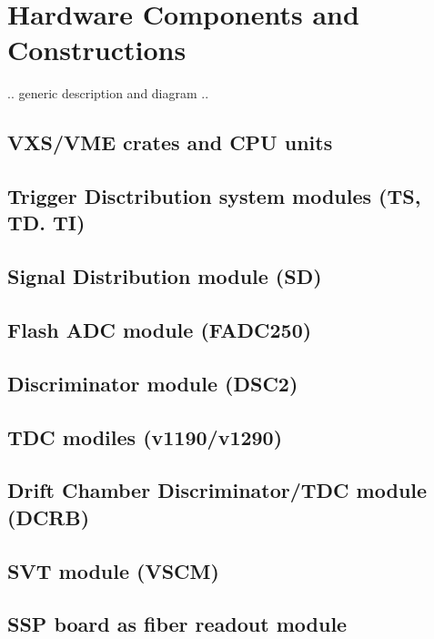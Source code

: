 \section{Hardware Components and Constructions}

.. generic description and diagram ..

\subsection{VXS/VME crates and CPU units}

\subsection{Trigger Disctribution system modules (TS, TD. TI)}
	
\subsection{Signal Distribution module (SD)}

\subsection{Flash ADC module (FADC250)}

\subsection{Discriminator module (DSC2)}

\subsection{TDC modiles (v1190/v1290)}

\subsection{Drift Chamber Discriminator/TDC module (DCRB)}

\subsection{SVT module (VSCM)}

\subsection{SSP board as fiber readout module}
